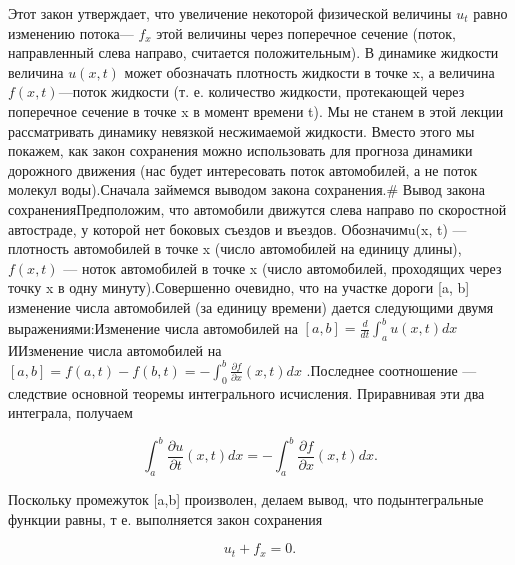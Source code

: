 \documentclass[
  ukrainian,
]{article}
\begin{document}
Этот закон утверждает, что увеличение некоторой физической величины
\(u_t\) равно изменению потока--- \(f_x\) этой величины через поперечное
сечение (поток, направленный слева направо, считается положительным). В
динамике жидкости величина \(u(x,t)\) может обозначать плотность
жидкости в точке x, а величина \(f(x,t)\)---поток жидкости (т. е.
количество жидкости, протекающей через поперечное сечение в точке x в
момент времени t). Мы не станем в этой лекции рассматривать динамику
невязкой несжимаемой жидкости. Вместо этого мы покажем, как закон
сохранения можно использовать для прогноза динамики дорожного движения
(нас будет интересовать поток автомобилей, а не поток молекул
воды).Сначала займемся выводом закона сохранения.\# Вывод закона
сохраненияПредположим, что автомобили движутся слева направо по
скоростной автостраде, у которой нет боковых съездов и въездов.
Обозначимu(x, t) --- плотность автомобилей в точке x (число автомобилей
на единицу длины),\(f(x, t)\) --- ноток автомобилей в точке x (число
автомобилей, проходящих через точку x в одну минуту).Совершенно
очевидно, что на участке дороги {[}a, b{]} изменение числа автомобилей
(за единицу времени) дается следующими двумя выражениями:Изменение числа
автомобилей на \([a, b] = \frac{d}{dt} \int_a^b u(x, t) dx\) ИИзменение
числа автомобилей на
\([a,b] = f(a,t) - f(b,t) = -\int_{0}^{b} \frac{\partial f}{\partial x}(x,t)dx\)
.Последнее соотношение --- следствие основной теоремы интегрального
исчисления. Приравнивая эти два интеграла, получаем

\[
\int_{a}^{b} \frac{\partial u}{\partial t}(x, t) dx = -\int_{a}^{b} \frac{\partial f}{\partial x}(x, t) dx.
\]

Поскольку промежуток {[}a,b{]} произволен, делаем вывод, что
подынтегральные функции равны, т е. выполняется закон сохранения

\[
u_t + f_x = 0.
\]
\end{document}
